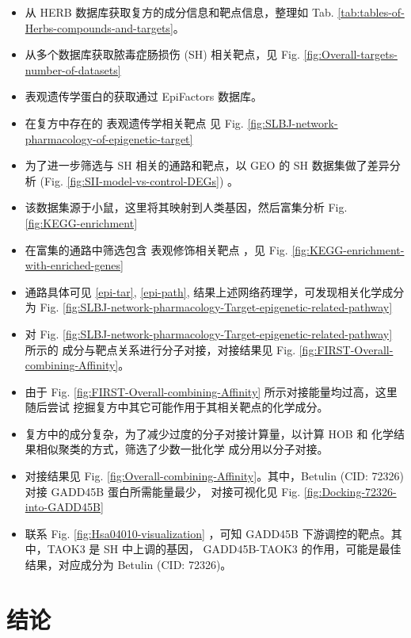 \documentclass[
]{article}
\providecommand{\tightlist}{%
  \setlength{\itemsep}{0pt}\setlength{\parskip}{0pt}}
\begin{document}
\begin{itemize}
\tightlist
\item
  从 HERB 数据库获取复方的成分信息和靶点信息，整理如 Tab. \ref{tab:tables-of-Herbs-compounds-and-targets}。
\item
  从多个数据库获取脓毒症肠损伤 (SH) 相关靶点，见 Fig. \ref{fig:Overall-targets-number-of-datasets}
\item
  表观遗传学蛋白的获取通过 EpiFactors 数据库。
\item
  在复方中存在的 表观遗传学相关靶点 见 Fig. \ref{fig:SLBJ-network-pharmacology-of-epigenetic-target}
\item
  为了进一步筛选与 SH 相关的通路和靶点，以 GEO 的 SH 数据集做了差异分析 (Fig. \ref{fig:SII-model-vs-control-DEGs}) 。
\item
  该数据集源于小鼠，这里将其映射到人类基因，然后富集分析 Fig. \ref{fig:KEGG-enrichment}
\item
  在富集的通路中筛选包含 表观修饰相关靶点 ，见 Fig. \ref{fig:KEGG-enrichment-with-enriched-genes}
\item
  通路具体可见 \ref{epi-tar}, \ref{epi-path}, 结果上述网络药理学，可发现相关化学成分为
  Fig. \ref{fig:SLBJ-network-pharmacology-Target-epigenetic-related-pathway}
\item
  对 Fig. \ref{fig:SLBJ-network-pharmacology-Target-epigenetic-related-pathway} 所示的
  成分与靶点关系进行分子对接，对接结果见 Fig. \ref{fig:FIRST-Overall-combining-Affinity}。
\item
  由于 Fig. \ref{fig:FIRST-Overall-combining-Affinity} 所示对接能量均过高，这里随后尝试
  挖掘复方中其它可能作用于其相关靶点的化学成分。
\item
  复方中的成分复杂，为了减少过度的分子对接计算量，以计算 HOB 和 化学结果相似聚类的方式，筛选了少数一批化学
  成分用以分子对接。
\item
  对接结果见 Fig. \ref{fig:Overall-combining-Affinity}。其中，Betulin (CID: 72326) 对接 GADD45B 蛋白所需能量最少，
  对接可视化见 Fig. \ref{fig:Docking-72326-into-GADD45B}
\item
  联系 Fig. \ref{fig:Hsa04010-visualization} ，可知 GADD45B 下游调控的靶点。其中，TAOK3 是 SH 中上调的基因，
  GADD45B-TAOK3 的作用，可能是最佳结果，对应成分为 Betulin (CID: 72326)。
\end{itemize}

\hypertarget{dis}{%
\section{结论}\label{dis}}
\end{document}
